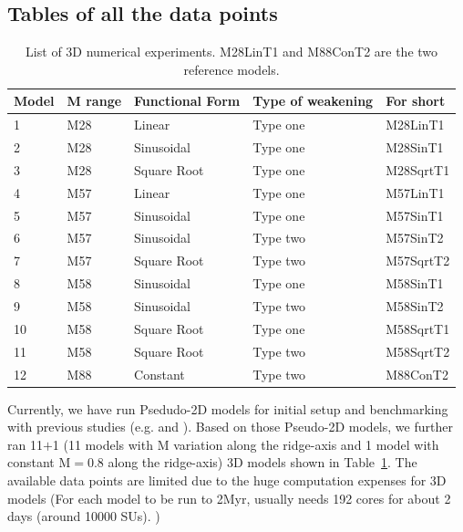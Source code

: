 \subsection{Tables of all the data points}

\begin{table}[h]
\centering
\begin{tabular}{l l l l l}
\hline
\hline
Model& M range & Functional Form & Type of weakening & For short \\ 
\hline
1    &  M28    &   Linear        & Type one   &  M28LinT1\\
\hline
2    &  M28    &   Sinusoidal    & Type one   &  M28SinT1\\
\hline
3    &  M28    &   Square Root   & Type one   &  M28SqrtT1 \\
\hline
4    &  M57    &   Linear        & Type one   &  M57LinT1 \\
\hline
5    &  M57    &   Sinusoidal    & Type one   &  M57SinT1 \\
\hline
6    &  M57    &   Sinusoidal    & Type two   &  M57SinT2 \\
\hline
7    &  M57    &   Square Root   & Type two   &  M57SqrtT2  \\
\hline
8    &  M58    &   Sinusoidal    & Type one   &  M58SinT1  \\
\hline
9    &  M58    &   Sinusoidal    & Type two   &  M58SinT2   \\
\hline
10   &  M58    &   Square Root   & Type one   &  M58SqrtT1   \\
\hline
11   &  M58    &   Square Root   & Type two   &  M58SqrtT2   \\
\hline
12   &  M88    &   Constant      & Type two   &  M88ConT2 \\
\hline
\hline
\end{tabular}
\caption{List of 3D numerical experiments. M28LinT1 and M88ConT2 are the two reference models.}
\label{Tab1_1}
\end{table}

Currently, we have run  Psedudo-2D models for initial setup and benchmarking with previous studies (e.g. \citep{Buck2005} and \citep{Tucholke2008}). Based on those Pseudo-2D models, we further ran 11$+$1 (11 models with M variation along the ridge-axis and 1 model with constant M$=0.8$ along the ridge-axis) 3D models shown in Table~\hyperref[Tab1_1]{\ref{Tab1_1}}. The available data points are limited due to the huge computation expenses for 3D models (For each model to be run to 2Myr, usually needs 192 cores for about 2 days (around 10000 SUs). )

